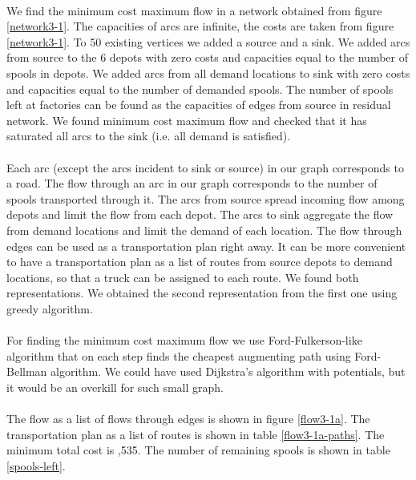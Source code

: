 \paragraph{}
We find the minimum cost maximum flow in a network obtained from figure \ref{network3-1}. The capacities of arcs are infinite, the costs are taken from figure \ref{network3-1}. To 50 existing vertices we added a source and a sink. We added arcs from source to the 6 depots with zero costs and capacities equal to the number of spools in depots. We added arcs from all demand locations to sink with zero costs and capacities equal to the number of demanded spools. The number of spools left at factories can be found as the capacities of edges from source in residual network. We found minimum cost maximum flow and checked that it has saturated all arcs to the sink (i.e. all demand is satisfied).

\paragraph{}
Each arc (except the arcs incident to sink or source) in our graph corresponds to a road. The flow through an arc in our graph corresponds to the number of spools transported through it. The arcs from source spread incoming flow among depots and limit the flow from each depot. The arcs to sink aggregate the flow from demand locations and limit the demand of each location. The flow through edges can be used as a transportation plan right away. It can be more convenient to have a transportation plan as a list of routes from source depots to demand locations, so that a truck can be assigned to each route. We found both representations. We obtained the second representation from the first one using greedy algorithm.

\paragraph{}
For finding the minimum cost maximum flow we use Ford-Fulkerson-like algorithm that on each step finds the cheapest augmenting path using Ford-Bellman algorithm. We could have used Dijkstra's algorithm with potentials, but it would be an overkill for such small graph.

\paragraph{}
The flow as a list of flows through edges is shown in figure \ref{flow3-1a}. The transportation plan as a list of routes is shown in table \ref{flow3-1a-paths}. The minimum total cost is ,535. The number of remaining spools is shown in table \ref{spools-left}.

